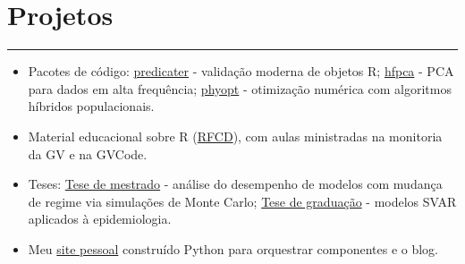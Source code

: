 \documentclass[11pt,oneside]{scrartcl}
\newcommand{\cvsection}[1]{%
    \vspace{-0.125em}%
    \section*{{\montserrat #1}}%
    \vspace{-1.75em}%
    \textcolor{darkgray}{\rule{\linewidth}{0.2pt}}%
    \vspace{0.5em}%
}
\begin{document}
\begin{minipage}[t]{0.55\linewidth}
    \cvsection{Projetos}
    \begin{itemize}
        \item Pacotes de código: \href{https://ricardo-semiao.github.io/tools/predicater/}{predicater} - validação moderna de objetos R; \href{https://ricardo-semiao.github.io/tools/hfpca/}{hfpca} - PCA para dados em alta frequência; \href{https://ricardo-semiao.github.io/tools/phyopt/}{phyopt} - otimização numérica com algoritmos híbridos populacionais.
        \item Material educacional sobre R (\href{https://ricardo-semiao.github.io/library/rfcd/}{RFCD}), com aulas ministradas na monitoria da GV e na GVCode.
        \item Teses: \href{https://github.com/ricardo-semiao/article-regime-id-performance}{Tese de mestrado} - análise do desempenho de modelos com mudança de regime via simulações de Monte Carlo; \href{https://github.com/ricardo-semiao/article-covid-svardiff}{Tese de graduação} - modelos SVAR aplicados à epidemiologia.
        \item Meu \href{https://ricardo-semiao.github.io/}{site pessoal} construído Python para orquestrar componentes e o blog.
    \end{itemize}
\end{minipage}\hfill%
%
%
\end{document}
